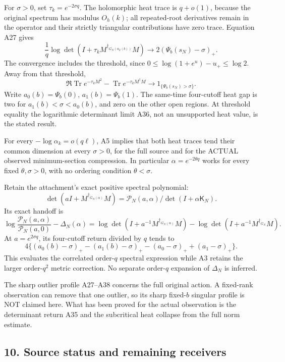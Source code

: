 \documentclass[11pt]{article}
\begin{document}
For \(\sigma>0\), set \(\tau_k=e^{-2\sigma q}\). The holomorphic heat trace is \(q+o(1)\), because the original spectrum has modulus \(O_h(k)\); all repeated-root derivatives remain in the operator and their strictly triangular contributions have zero trace. Equation A27 gives \[
 \frac1q\log\det(I+\tau_kM^{\dagger_{G_N(\alpha_k(b))}}M)
 \longrightarrow2(\Psi_b(s_N)-\sigma)_+.
 \tag{A36}
\] The convergence includes the threshold, since \(0\le\log(1+e^u)-u_+\le\log2\). Away from that threshold, \[
 \Re\operatorname{Tr}e^{-\tau_kM^2}
 -\operatorname{Tr}e^{-\tau_kM^\dagger M}
 \longrightarrow1_{\{\Psi_b(s_N)>\sigma\}}.
 \tag{A37}
\] Write \(a_0(b)=\Psi_b(0)\), \(a_1(b)=\Psi_b(1)\). The same-time four-cutoff heat gap is two for \(a_1(b)<\sigma<a_0(b)\), and zero on the other open regions. At threshold equality the logarithmic determinant limit A36, not an unsupported heat value, is the stated result.

For every \(-\log\alpha_k=o(q\ell)\), A5 implies that both heat traces tend their common dimension at every \(\sigma>0\), for the full source and for the ACTUAL observed minimum-section compression. In particular \(\alpha=e^{-2\theta q}\) works for every fixed \(\theta,\sigma>0\), with no ordering condition \(\theta<\sigma\).

Retain the attachment's exact positive spectral polynomial: \[
 \det(aI+M^{\dagger_{G_N(\alpha)}}M)
 =\mathscr P_N(a,\alpha)/\det(I+\alpha\mathsf K_N).
\] Its exact handoff is \[
 \log\frac{\mathscr P_N(a,\alpha)}{\mathscr P_N(a,0)}
 -\Delta_N(\alpha)
 =
 \log\det(I+a^{-1}M^{\dagger_{G_N(\alpha)}}M)
 -\log\det(I+a^{-1}M^{\dagger_{G_N}}M).
\] At \(a=e^{2\sigma q}\), its four-cutoff return divided by \(q\) tends to \[
 \boxed{
 4\{(a_0(b)-\sigma)_+-(a_1(b)-\sigma)_+
 -(a_0-\sigma)_++(a_1-\sigma)_+\}.
 }\tag{A38}
\] This evaluates the correlated order-\(q\) spectral expression while A3 retains the larger order-\(q^2\) metric correction. No separate order-\(q\) expansion of \(\Delta_N\) is inferred.

The sharp outlier profile A27--A38 concerns the full original action. A fixed-rank observation can remove that one outlier, so its sharp fixed-\(b\) singular profile is NOT claimed here. What has been proved for the actual observation is the determinant return A35 and the subcritical heat collapse from the full norm estimate.

\subsection{10. Source status and remaining receivers}\label{source-status-and-remaining-receivers}
\end{document}
